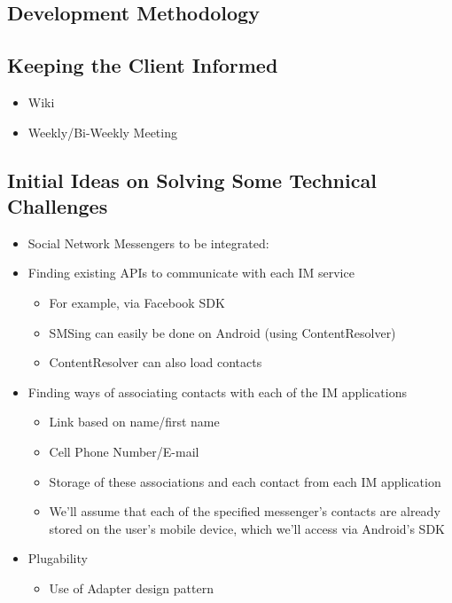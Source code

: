 

\subsection{Development Methodology}


\subsection{Keeping the Client Informed}
\begin{itemize}
    \item Wiki
    \item Weekly/Bi-Weekly Meeting
\end{itemize}
\subsection{Initial Ideas on Solving Some Technical Challenges}
\begin{itemize}
    \item Social Network Messengers to be integrated:
    \item Finding existing APIs to communicate with each IM service 
        \begin{itemize}
            \item For example, via Facebook SDK
            \item SMSing can easily be done on Android (using ContentResolver)
            \item ContentResolver can also load contacts
        \end{itemize}
    \item Finding ways of associating contacts with each of the IM applications
        \begin{itemize}
            \item Link based on name/first name
            \item Cell Phone Number/E-mail
            \item Storage of these associations and each contact from each IM application
            \item We'll assume that each of the specified messenger's contacts are already stored on the user's mobile device, which we'll access via Android's SDK
        \end{itemize}
    \item Plugability
        \begin{itemize}
            \item Use of Adapter design pattern
        \end{itemize}
\end{itemize}
